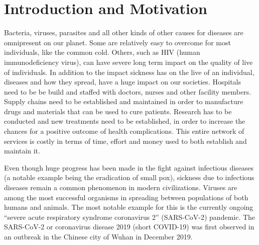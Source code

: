 
\chapter{Introduction and Motivation} %

\label{chap:introduction} %


Bacteria, viruses, parasites and all other kinds of other causes for diseases are omnipresent on our planet\cite{??}. Some are
relatively easy to overcome for most individuals, like the common cold\cite{??}. Others, such as HIV (human immunodeficiency virus),
can have severe long term impact on the quality of live of individuals\cite{??}. In addition to the impact sickness has
on the live of an individual, diseases and how they spread, have a huge impact on our societies. Hospitals need to be 
be build and staffed with doctors, nurses and other facility members. Supply chains need to be established and maintained in order
to manufacture drugs and materials that can be used to cure patients. Research has to be conducted and new treatments need to be
established, in order to increase the chances for a positive outcome of health complications. This entire network of services is
costly in terms of time, effort  and money used to both establish and maintain it.
\par
Even though huge progress has been made in the fight against infectious diseases (a notable example being the eradication of
small pox\cite{??}), sickness due to infectious diseases remain a common phenomenon in modern civilizations. Viruses are
among the most successful organisms in spreading between populations of both humans and animals\cite{??}. The most notable example
for this is the currently ongoing ``severe acute respiratory syndrome coronavirus 2'' (SARS-CoV-2) pandemic. The SARS-CoV-2 or
coronavirus disease 2019 (short COVID-19) was first observed in an outbreak in the Chinese city of Wuhan in December 2019\cite{??}.
